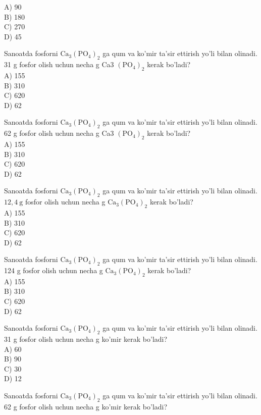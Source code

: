 A) 90\\
B) 180\\
C) 270\\
D) 45
  \item Sanoatda fosforni $\mathrm{Ca}_{3}\left(\mathrm{PO}_{4}\right)_{2}$ ga qum va ko'mir ta'sir ettirish yo'li bilan olinadi. 31 g fosfor olish uchun necha g Ca3 $\left(\mathrm{PO}_{4}\right)_{2}$ kerak bo'ladi?\\
A) 155\\
B) 310\\
C) 620\\
D) 62
  \item Sanoatda fosforni $\mathrm{Ca}_{3}\left(\mathrm{PO}_{4}\right)_{2}$ ga qum va ko'mir ta'sir ettirish yo'li bilan olinadi. 62 g fosfor olish uchun necha g Ca3 $\left(\mathrm{PO}_{4}\right)_{2}$ kerak bo'ladi?\\
A) 155\\
B) 310\\
C) 620\\
D) 62
  \item Sanoatda fosforni $\mathrm{Ca}_{3}\left(\mathrm{PO}_{4}\right)_{2}$ ga qum va ko'mir ta'sir ettirish yo'li bilan olinadi. $12,4 \mathrm{~g}$ fosfor olish uchun necha g $\mathrm{Ca}_{3}\left(\mathrm{PO}_{4}\right)_{2}$ kerak bo'ladi?\\
A) 155\\
B) 310\\
C) 620\\
D) 62
  \item Sanoatda fosforni $\mathrm{Ca}_{3}\left(\mathrm{PO}_{4}\right)_{2}$ ga qum va ko'mir ta'sir ettirish yo'li bilan olinadi. 124 g fosfor olish uchun necha g $\mathrm{Ca}_{3}\left(\mathrm{PO}_{4}\right)_{2}$ kerak bo'ladi?\\
A) 155\\
B) 310\\
C) 620\\
D) 62
  \item Sanoatda fosforni $\mathrm{Ca}_{3}\left(\mathrm{PO}_{4}\right)_{2}$ ga qum va ko'mir ta'sir ettirish yo'li bilan olinadi. 31 g fosfor olish uchun necha g ko'mir kerak bo'ladi?\\
A) 60\\
B) 90\\
C) 30\\
D) 12
  \item Sanoatda fosforni $\mathrm{Ca}_{3}\left(\mathrm{PO}_{4}\right)_{2}$ ga qum va ko'mir ta'sir ettirish yo'li bilan olinadi. 62 g fosfor olish uchun necha g ko'mir kerak bo'ladi?\\

